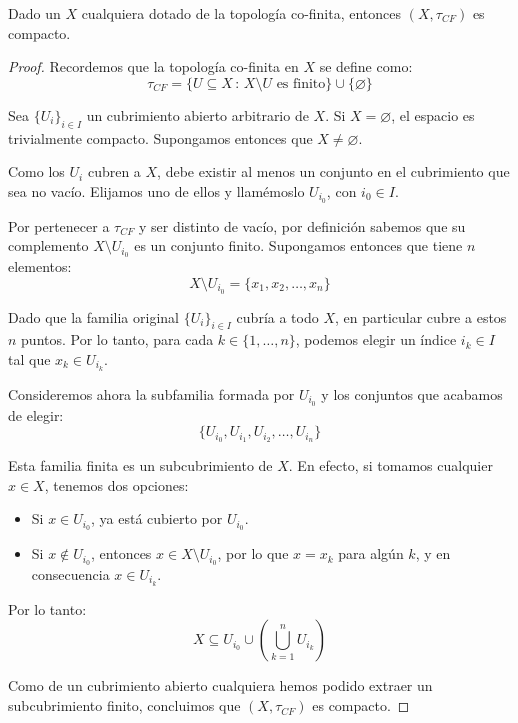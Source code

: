 \documentclass{article}
\theoremstyle{plain}
\theoremstyle{definition}
\newenvironment{ejercicio}[1]{\begin{trivlist}
\item[\hskip \labelsep {\bfseries Ejercicio}\hskip \labelsep {\bfseries #1.}]}{\end{trivlist}}
\begin{document}
\begin{ejercicio}{6}
    Dado un \( X \) cualquiera dotado de la topología co-finita, entonces \( (X, \tau_{CF}) \) es compacto.
\end{ejercicio}
\begin{proof}
    Recordemos que la topología co-finita en \( X \) se define como:
    \[ \tau_{CF} = \{ U \subseteq X \, : \, X \setminus U \text{ es finito} \} \cup \{ \varnothing \} \]

    Sea \( {\{ U_i \}}_{i \in I} \) un cubrimiento abierto arbitrario de \( X \). Si \( X = \varnothing \), el espacio es trivialmente compacto. Supongamos entonces que \( X \neq \varnothing \).

    Como los \( U_i \) cubren a \( X \), debe existir al menos un conjunto en el cubrimiento que sea no vacío. Elijamos uno de ellos y llamémoslo \( U_{i_0} \), con \( i_0 \in I \).

    Por pertenecer a \( \tau_{CF} \) y ser distinto de vacío, por definición sabemos que su complemento \( X \setminus U_{i_0} \) es un conjunto finito. Supongamos entonces que tiene \( n \) elementos:
    \[ X \setminus U_{i_0} = \{ x_1, x_2, \dots, x_n \} \]

    Dado que la familia original \( {\{ U_i \}}_{i \in I} \) cubría a todo \( X \), en particular cubre a estos \( n \) puntos. Por lo tanto, para cada \( k \in \{1, \dots, n\} \), podemos elegir un índice \( i_k \in I \) tal que \( x_k \in U_{i_k} \).

    Consideremos ahora la subfamilia formada por \( U_{i_0} \) y los conjuntos que acabamos de elegir:
    \[ \{ U_{i_0}, U_{i_1}, U_{i_2}, \dots, U_{i_n} \} \]

    Esta familia finita es un subcubrimiento de \( X \). En efecto, si tomamos cualquier \( x \in X \), tenemos dos opciones:
    \begin{itemize}
        \item Si \( x \in U_{i_0} \), ya está cubierto por \( U_{i_0} \).
        \item Si \( x \notin U_{i_0} \), entonces \( x \in X \setminus U_{i_0} \), por lo que \( x = x_k \) para algún \( k \), y en consecuencia \( x \in U_{i_k} \).
    \end{itemize}

    Por lo tanto:
    \[ X \subseteq U_{i_0} \cup \left( \bigcup_{k=1}^n U_{i_k} \right) \]

    Como de un cubrimiento abierto cualquiera hemos podido extraer un subcubrimiento finito, concluimos que \( (X, \tau_{CF}) \) es compacto.
\end{proof}
\end{document}

